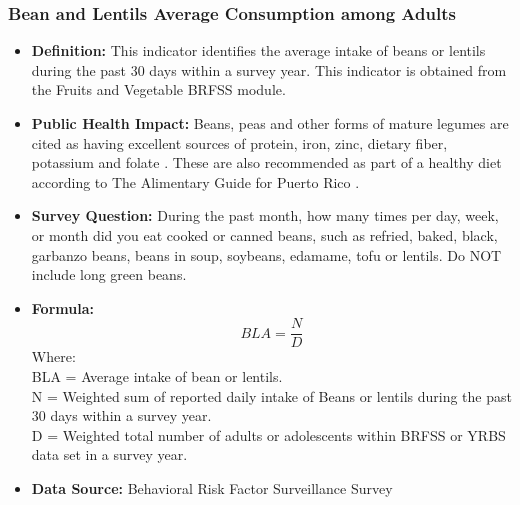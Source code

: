 \documentclass[12pt,letterpaper]{report}
\begin{document}
		\subsubsection{Bean and Lentils Average Consumption among Adults} 
	\begin{itemize}
		\item \textbf{Definition:} This indicator identifies the average intake of beans or lentils during the past 30 days within a survey year. This indicator is obtained from the Fruits and Vegetable BRFSS module.
		\item \textbf{Public Health Impact:} Beans, peas and other forms of mature legumes are cited as having excellent sources of protein, iron, zinc, dietary fiber, potassium and folate \cite{mitchell2009consumption}. These are also recommended as part of a healthy diet according to The Alimentary Guide for Puerto Rico \cite{GuiaAlimentariaPR}. 
		\item \textbf{Survey Question:} During the past month, how many times per day, week, or month did you eat cooked or canned beans, such as refried, baked, black, garbanzo beans, beans in soup, soybeans, edamame, tofu or lentils. Do NOT include long green beans.
		\item \textbf{Formula:} 
			\begin{equation}
				BLA = \frac{N}{D}
			\end{equation}
Where: \\
			BLA = Average intake of bean or lentils.\\
			
			N = Weighted sum of reported daily intake of Beans or lentils during the past 30 days within a survey year.\\
			
			D = Weighted total number of adults or adolescents within BRFSS or YRBS data set in a survey year.\\
			
		\item \textbf{Data Source:} Behavioral Risk Factor Surveillance Survey
	\end{itemize}
	
\end{document}
